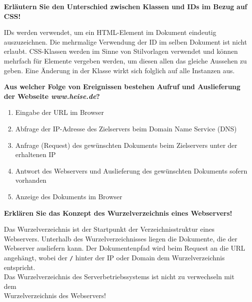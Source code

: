 \documentclass[ngerman,addpoints,10pt]{exam}
\begin{document}
\begin{questions}
		\question[10]
		\textbf{Erläutern Sie den Unterschied zwischen Klassen und IDs im Bezug auf CSS!}
		\droppoints
		\begin{solutionorbox}[4cm]
			\begin{flushleft}
			IDs werden verwendet, um ein HTML-Element im Dokument eindeutig auszuzeichnen.
			Die mehrmalige Verwendung der ID im selben Dokument ist nicht erlaubt. 
			CSS-Klassen werden im Sinne von Stilvorlagen verwendet und können mehrfach für
			Elemente vergeben werden, um diesen allen das gleiche Aussehen zu geben. Eine
			Änderung in der Klasse wirkt sich folglich auf alle Instanzen aus.
			\end{flushleft}
		\end{solutionorbox}
		\bigskip
		
		\newpage

				
		\question[10]
		\textbf{Aus welcher Folge von Ereignissen bestehen Aufruf und Auslieferung der Webseite \textit{www.heise.de}?}
		\droppoints
		\begin{solutionorbox}[6cm]
			\begin{enumerate}
			\item Eingabe der URL im Browser
			\item Abfrage der IP-Adresse des Zielservers beim Domain Name Service (DNS)
			\item Anfrage (Request) des gewünschten Dokuments beim Zielservers unter der erhaltenen IP
			\item Antwort des Webservers und Auslieferung des gewünschten Dokuments sofern vorhanden
			\item Anzeige des Dokuments im Browser
			\end{enumerate}
		\end{solutionorbox}
		\bigskip
		
		
		\question[10]
		\textbf{Erklären Sie das Konzept des Wurzelverzeichnis eines Webservers!}
		\droppoints
		\begin{solutionorbox}[6cm]
			\begin{flushleft}
			Das Wurzelverzeichnis ist der Startpunkt der Verzeichnisstruktur eines Webservers. 
			Unterhalb des Wurzelverzeichnisses liegen die Dokumente, die der Webserver ausliefern kann. 
			Der Dokumentenpfad wird beim Request an die URL angehängt, wobei der \texttt{/} hinter der IP 
			oder Domain dem Wurzelverzeichnis entspricht.\\
			Das Wurzelverzeichnis des Serverbetriebssystems ist nicht zu verwechseln mit dem \\
			Wurzelverzeichnis
			des Webservers!
			\end{flushleft}
		\end{solutionorbox}
		\bigskip

	\end{questions}
\end{document}
